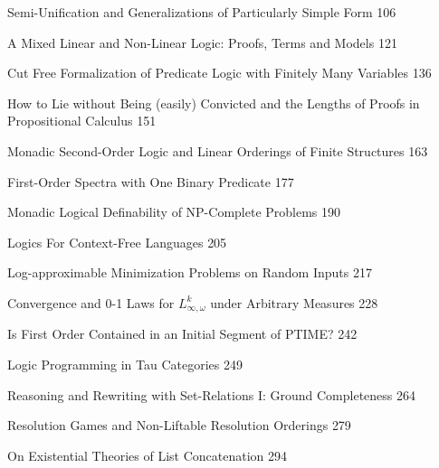 \medskip






{Semi-Unification and Generalizations of Particularly Simple Form} {106}

{A Mixed Linear and Non-Linear Logic: Proofs, Terms and Models} {121}

{Cut Free Formalization of Predicate Logic with Finitely Many Variables} {136}


{How to Lie without Being (easily) Convicted and the Lengths of Proofs in Propositional Calculus} {151}
\medskip






{Monadic Second-Order Logic and Linear Orderings of Finite Structures} {163}

 {First-Order Spectra with One Binary Predicate} {177}

 {Monadic Logical Definability of NP-Complete Problems} {190}

 {Logics For Context-Free Languages}
{205}


{Log-approximable Minimization Problems on Random Inputs} {217}

{Convergence and 0-1 Laws for $L^k_{\infty,\omega}$ under Arbitrary Measures} {228}


 {Is First Order Contained in an Initial Segment of PTIME?} {242}

\medskip




 {Logic Programming in Tau Categories}
{249}

 {Reasoning and Rewriting with Set-Relations I: Ground Completeness} {264}

{Resolution Games and Non-Liftable Resolution Orderings} {279}

{On Existential Theories of List Concatenation} {294}

